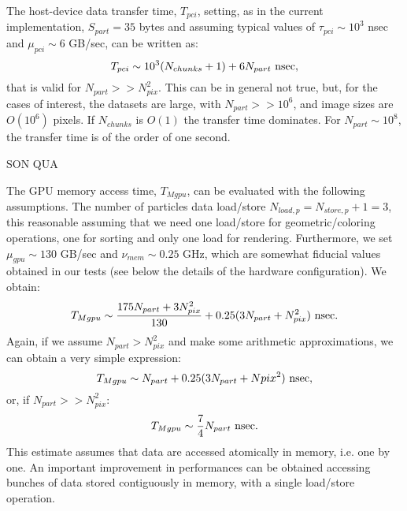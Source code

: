 \documentclass[11pt]{article}
\begin{document}
The host-device data transfer time, $T_{pci}$, setting, as in the current implementation, 
$S_{part} = 35$ bytes and assuming typical values of 
$\tau_{pci} \sim 10^3$ nsec and $\mu_{pci} \sim 6$ GB/sec, can be written as:
\begin{equation}
T_{pci} \sim 10^3(N_{chunks} + 1) + 6 N_{part}\ {\rm nsec},
\end{equation}
that is valid for $N_{part} >> N_{pix}^2$. This can be in general not true, but, 
for the cases of interest, the datasets are large, with
$N_{part} >> 10^6$, and image sizes are $O(10^6)$ pixels.
If $N_{chunks}$ is $O(1)$ the transfer 
time dominates. For $N_{part}\sim 10^8$, the transfer time is of the order of
one second.

SON QUA

The GPU memory access time, $T_{Mgpu}$, can be evaluated with the 
following assumptions. The number of particles data load/store $N_{load,p} = 
N_{store,p}+1 = 3$, this reasonable assuming that we need one load/store
for geometric/coloring operations, one for sorting and only one load
for rendering. Furthermore, we 
set $\mu_{gpu} \sim 130$ GB/sec and $\nu_{mem} \sim 0.25$ GHz, which are somewhat
fiducial values obtained in our tests (see below the details of the 
hardware configuration). We obtain:
\begin{equation}
T_{Mgpu} \sim {175 N_{part} + 3 N_{pix}^2\over 130} + 0.25 (3 N_{part} + N_{pix}^2)\ {\rm nsec}.
\end{equation}
Again, if we assume $N_{part} > N_{pix}^2$ and make some arithmetic approximations,
we can obtain a very simple expression:
\begin{equation}
T_{Mgpu} \sim N_{part} + 0.25 (3 N_{part} + N{pix}^2)\ {\rm nsec},
\end{equation}
or, if $N_{part} >> N_{pix}^2$:
\begin{equation}
T_{Mgpu} \sim {7\over 4} N_{part}\ {\rm nsec}.
\end{equation}
This estimate assumes that data are accessed atomically in memory, i.e. one by one.
An important improvement in performances can be obtained accessing bunches 
of data stored contiguously in memory, with a single load/store operation.
\end{document}
